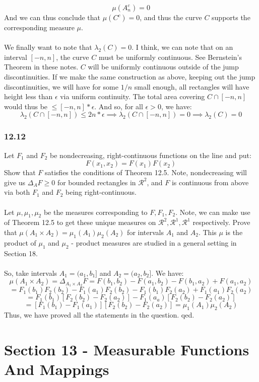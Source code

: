 \documentclass[12pt,a4paper]{article}
\newcommand{\1}[1]{\mathbbm{1}\left\{ #1 \right\}}
\newcommand{\rcal}{\mathcal{R}}
\begin{document}
$$
	\mu(A_n^c) = 0
$$
And we can thus conclude that $\mu(C^c) = 0$, and thus the curve $C$ supports the corresponding measure $\mu$.
\\\\
We finally want to note that $\lambda_2(C) = 0$. I think, we can note that on an interval $[-n,n]$, the curve $C$ must be uniformly continuous. See Bernstein's Theorem in these notes. $C$ will be uniformly continuous outside of the jump discontinuities. If we make the same construction as above, keeping out the jump discontinuities, we will have for some $1/n$ small enough, all rectangles will have height less than $\epsilon$ via uniform continuity. The total area covering $C \cap [-n,n]$ would thus be $\leq [-n,n] * \epsilon$. And so, for all $\epsilon > 0$, we have:
$$
	\lambda_2(C \cap [-n,n]) \leq 2n * \epsilon \implies
	\lambda_2(C \cap [-n,n]) = 0 \implies
	\lambda_2(C) = 0
$$

\subsubsection{12.12} Let $F_1$ and $F_2$ be nondecreasing, right-continuous functions on the line and put:
$$
	F(x_1,x_2) = F(x_1)F(x_2)
$$
Show that $F$ satisfies the conditions of Theorem 12.5. Note, nondecreasing will give us $\Delta_AF \geq 0$ for bounded rectangles in $\rcal^2$, and $F$ is continuous from above via both $F_1$ and $F_2$ being right-continuous.
\\\\
Let $\mu,\mu_1,\mu_2$ be the measures corresponding to $F,F_1,F_2$. Note, we can make use of Theorem 12.5 to get these unique measures on $\rcal^2,\rcal^1,\rcal^1$ respectively. Prove that $\mu(A_1 \times A_2) = \mu_1(A_1)\mu_2(A_2)$ for intervals $A_1$ and $A_2$. This $\mu$ is the product of $\mu_1$ and $\mu_2$ - product measures are studied in a general setting in Section 18.
\\\\
So, take intervals $A_1 = (a_1,b_1]$ and $A_2 = (a_2,b_2]$. We have:
$$
	\mu(A_1 \times A_2) =
	\Delta_{A_1 \times A_2}F =
	F(b_1,b_2) - F(a_1,b_2) - F(b_1,a_2) + F(a_1,a_2)
$$
$$
	= F_1(b_1)F_2(b_2) - F_1(a_1)F_2(b_2) - F_1(b_1)F_2(a_2) + F_1(a_1)F_2(a_2) 
$$
$$
	= F_1(b_1)\left[F_2(b_2) - F_2(a_2)\right] - F_1(a_a)\left[F_2(b_2) - F_2(a_2)\right]
$$
$$
	= \left[F_1(b_1) - F_1(a_1)\right]\left[F_2(b_2) - F_2(a_2)\right] = \mu_1(A_1)\mu_2(A_2)
$$
Thus, we have proved all the statements in the question. qed.

\section{Section 13 - Measurable Functions And Mappings}
\end{document}
